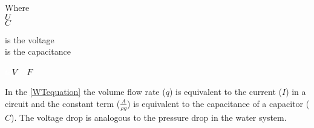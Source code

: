 \begin{minipage}[t]{0.20\textwidth}
Where\\
\hspace*{8mm} $U$ \\
\hspace*{8mm} $C$ 
\end{minipage}
\begin{minipage}[t]{0.68\textwidth}
\vspace*{2mm}
is the voltage\\
is the capacitance 
\end{minipage}
\begin{minipage}[t]{0.10\textwidth}
\vspace*{2mm}
\textcolor{White}{te}$\unit{V}$
\textcolor{White}{te}$\unit{F}$
\end{minipage}

In the \eqref{WTequation} the volume flow rate ($q$) is equivalent to the current ($I$) in a 
circuit and the constant term \big($\frac{A}{\rho g}$\big) is equivalent to the capacitance of a capacitor ($C$). The voltage drop is analogous to the pressure drop in the water system.

%
%
%
%
%
%
%


